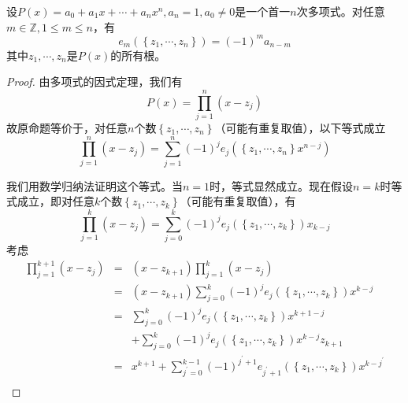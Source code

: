 \documentclass[../main.tex]{subfiles}
\begin{document}
\begin{theorem}\label{thm:A.7}
    设$P\left(x\right)=a_0+a_1x+\cdots+a_nx^n,a_n=1,a_0\neq 0$是一个首一$n$次多项式。对任意$m\in\mathbb{Z},1\leq m\leq n$，有
    \[e_m\left(\left\{z_1,\cdots,z_n\right\}\right)=\left(-1\right)^m a_{n-m}\]
    其中$z_1,\cdots,z_n$是$P\left(x\right)$的所有根。
\end{theorem}
\begin{proof}
    由多项式的因式定理，我们有
    \[P\left(x\right)=\prod_{j=1}^n\left(x-z_j\right)\]
    故原命题等价于，对任意$n$个数$\left\{z_1,\cdots,z_n\right\}$（可能有重复取值），以下等式成立
    \[\prod_{j=1}^n\left(x-z_j\right)=\sum_{j=1}^n\left(-1\right)^je_j\left(\left\{z_1,\cdots,z_n\right\}x^{n-j}\right)\]

    我们用数学归纳法证明这个等式。当$n=1$时，等式显然成立。现在假设$n=k$时等式成立，即对任意$k$个数$\left\{z_1,\cdots,z_k\right\}$（可能有重复取值），有
    \[\prod_{j=1}^k\left(x-z_j\right)=\sum_{j=0}^k\left(-1\right)^j e_j\left(\left\{z_1,\cdots,z_k\right\}\right)x_{k-j}\]
    考虑
    \[\begin{array}{rcl}
            \prod_{j=1}^{k+1}\left(x-z_j\right) & = & \left(x-z_{k+1}\right)\prod_{j=1}^k\left(x-z_j\right)                                                                                                                                               \\
                                                & = & \left(x-z_{k+1}\right)\sum_{j=0}^k\left(-1\right)^j e_j\left(\left\{z_1,\cdots,z_k\right\}\right)x^{k-j}                                                                                            \\
                                                & = & \sum_{j=0}^k\left(-1\right)^j e_j\left(\left\{z_1,\cdots,z_k\right\}\right)x^{k+1-j}                                                                                                                \\
                                                &   & +\sum_{j=0}^k\left(-1\right)^j e_j\left(\left\{z_1,\cdots,z_k\right\}\right)x^{k-j}z_{k+1}                                                                                                          \\
                                                & = & x^{k+1}+\sum_{j^\prime=0}^{k-1}\left(-1\right)^{j^\prime+1}e_{j^\prime+1}\left(\left\{z_1,\cdots,z_k\right\}\right)x^{k-j^\prime}                                                                   \\

\end{array}\]
\end{proof}
\end{document}
